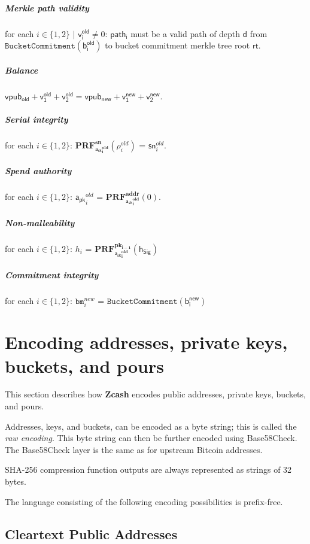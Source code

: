 \documentclass[8pt]{article}
\newcommand{\Zcash}{\textbf{Zcash} }
\newcommand{\SpendAuthorityPublic}{\mathsf{a_{pk}}}
\newcommand{\SpendAuthorityPrivate}{\mathsf{a_{sk}}}
\newcommand{\BucketAddressRand}{\mathsf{\rho}}
\newcommand{\PRF}[2]{\mathbf{PRF_{#1}^{#2}}}
\newcommand{\PRFaddr}[1]{\PRF{#1}{addr}}
\newcommand{\PRFsn}[1]{\PRF{#1}{sn}}
\newcommand{\PRFpk}[2]{\PRF{#1}{pk_{#2}}}
\newcommand{\bm}{\mathbf{\mathtt{bm}}}
\newcommand{\MerkleDepth}{\mathsf{d}}
\newcommand{\sn}{\mathsf{sn}}
\newcommand{\rt}{\mathsf{rt}}
\newcommand{\hSig}{\mathsf{h_{Sig}}}
\newcommand{\vpubold}{\mathsf{vpub_{old}}}
\newcommand{\vpubnew}{\mathsf{vpub_{new}}}
\newcommand{\bOld}[1]{\mathsf{b_{#1}^{old}}}
\newcommand{\bNew}[1]{\mathsf{b_{#1}^{new}}}
\newcommand{\vOld}[1]{\mathsf{v_{#1}^{old}}}
\newcommand{\vNew}[1]{\mathsf{v_{#1}^{new}}}
\newcommand{\path}[1]{\mathsf{path_{#1}}}
\newcommand{\BucketCommitment}[1]{\mathtt{BucketCommitment(#1)}}
\begin{document}
\subparagraph{Merkle path validity}

for each $i \in \{1, 2\}$ $\mid$ $\vOld{i} \neq 0$: $\path{i}$ must be a valid path of depth $\MerkleDepth$ from \linebreak $\BucketCommitment{\bOld{i}}$ to bucket commitment merkle tree root $\rt$.

\subparagraph{Balance}

$\vpubold + \vOld{1} + \vOld{2} = \vpubnew + \vNew{1} + \vNew{2}$.

\subparagraph{Serial integrity}

for each $i \in \{1, 2\}$: $\PRFsn{\SpendAuthorityPrivate^{old}_{i}}(\BucketAddressRand^{old}_{i})$ = $\sn^{old}_{i}$.

\subparagraph{Spend authority}

for each $i \in \{1, 2\}$: $\SpendAuthorityPublic^{old}_{i}$ = $\PRFaddr{\SpendAuthorityPrivate^{old}_{i}}(0)$.

\subparagraph{Non-malleability}

for each $i \in \{1, 2\}$: $h_i$ = $\PRFpk{\SpendAuthorityPrivate^{old}_i}{i-1}(\hSig)$

\subparagraph{Commitment integrity}

for each $i \in \{1, 2\}$: $\bm^{new}_i$ = $\BucketCommitment{\bNew{i}}$

\section{Encoding addresses, private keys, buckets, and pours}

This section describes how \Zcash encodes public addresses, private keys,
buckets, and pours.

Addresses, keys, and buckets, can be encoded as a byte string; this is called
the \emph{raw encoding}. This byte string can then be further encoded using
Base58Check. The Base58Check layer is the same as for upstream Bitcoin
addresses.

SHA-256 compression function outputs are always represented as strings of 32
bytes.

The language consisting of the following encoding possibilities is prefix-free.

\subsection{Cleartext Public Addresses}
\end{document}
